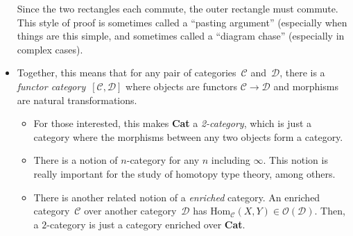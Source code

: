 \documentclass{lecturenotes}
\newcommand{\obj}[1]{\ensuremath{\mathcal{O}(#1)}}
\renewcommand{\hom}[3][]{\ensuremath{\text{Hom}_{#1}(#2, #3)}}
\renewcommand{\Cat}{\textbf{Cat}\xspace}
\begin{document}
\begin{itemize}
\begin{center}
  \end{center}
  Since the two rectangles each commute, the outer rectangle must commute.
  This style of proof is sometimes called a ``pasting argument'' (especially when things are this simple, and sometimes called a ``diagram chase'' (especially in complex cases).
\item Together, this means that for any pair of categories~$\mathcal{C}$ and~$\mathcal{D}$, there is a \emph{functor category}~$[\mathcal{C}, \mathcal{D}]$ where objects are functors $\mathcal{C} \to \mathcal{D}$ and morphisms are natural transformations.
  \begin{itemize}
  \item For those interested, this makes \Cat a \emph{2-category}, which is just a category where the morphisms between any two objects form a category.
  \item There is a notion of $n$-category for any $n$ including $\infty$.
    This notion is really important for the study of homotopy type theory, among others.
  \item There is another related notion of a \emph{enriched} category.
    An enriched category~$\mathcal{C}$ over another category~$\mathcal{D}$ has $\hom[\mathcal{C}]{X}{Y} \in \obj{\mathcal{D}}$.
    Then, a $2$-category is just a category enriched over \Cat.
  \end{itemize}
\end{itemize}
\end{document}
